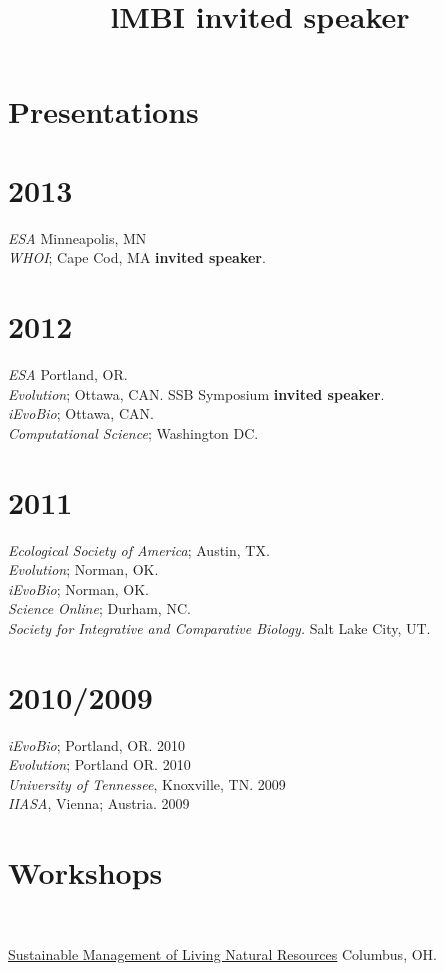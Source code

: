 \documentclass[margin]{res}
\begin{document}
\begin{resume}
\section{Presentations} 
\section{\textnormal{2013}}
  \emph{ESA} Minneapolis, MN \\ 
  \emph{WHOI}; Cape Cod, MA \textbf{invited speaker}.\\
\section{\textnormal{2012}}
  \emph{ESA} Portland, OR. \\ 
  \emph{Evolution}; Ottawa, CAN. SSB Symposium \textbf{invited speaker}.\\
  \emph{iEvoBio}; Ottawa, CAN. \\
  \emph{Computational Science}; Washington DC. 
\section{\textnormal{2011}}
  \emph{Ecological Society of America}; Austin, TX. \\
  \emph{Evolution}; Norman, OK. \\
  \emph{iEvoBio}; Norman, OK. \\
  \emph{Science Online}; Durham, NC.\\
  \emph{Society for Integrative and Comparative Biology.} Salt Lake City, UT. \\
 \section{\textnormal{2010/2009}}
  \emph{iEvoBio}; Portland, OR. 2010 \\
  \emph{Evolution}; Portland OR. 2010 \\
 \emph{University of Tennessee}, Knoxville, TN. 2009 \\
 \emph{IIASA}, Vienna; Austria. 2009


\section{Workshops}
\begin{format}
\title{l} \\
\body
\end{format}

\title{MBI \textbf{invited speaker}}
\begin{position}
\href{http://www.mbi.ohio-state.edu/2013/ws3description.html}{Sustainable Management of Living Natural Resources} Columbus, OH.  
\vspace{-.25cm}
\end{position}


\end{resume}
\end{document}
